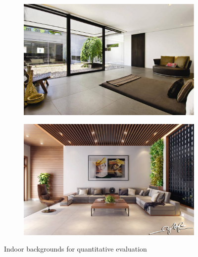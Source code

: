 \begin{figure}[!h]
	\begin{center}
		\begin{subfigure}[h]{0.49\textwidth}
			\centering
			\includegraphics[width=1\textwidth]{"contents/images/06-indoor1"}
		\end{subfigure}
		\hfill
		\begin{subfigure}[h]{0.49\textwidth}
			\centering
			\includegraphics[width=1\textwidth]{"contents/images/06-indoor2"}
		\end{subfigure}
	\end{center}
	\vspace{-0.5cm}
	\caption[Indoor backgrounds for quantitative evaluation]{Indoor backgrounds for quantitative evaluation}
	\label{fig:test-indoor}
\end{figure}

